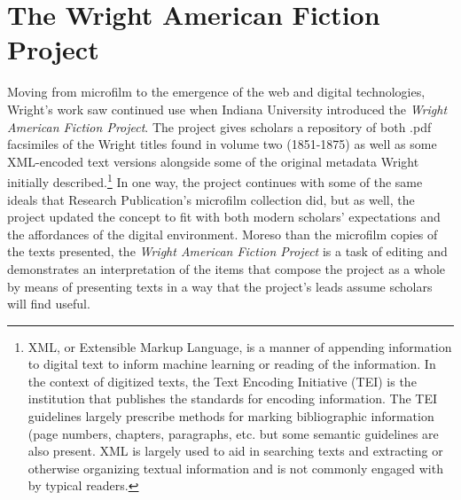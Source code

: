 \section{The Wright American Fiction Project}
Moving from microfilm to the emergence of the web and digital technologies, Wright's work saw continued use when Indiana University introduced the \textit{Wright American Fiction Project}. The project gives scholars a repository of both .pdf facsimiles of the Wright titles found in volume two (1851-1875) as well as some XML-encoded text versions alongside some of the original metadata Wright initially described.\footnote{XML, or Extensible Markup Language, is a manner of appending information to digital text to inform machine learning or reading of the information. In the context of digitized texts, the Text Encoding Initiative (TEI) is the institution that publishes the standards for encoding information. The TEI guidelines largely prescribe methods for marking bibliographic information (page numbers, chapters, paragraphs, etc. but some semantic guidelines are also present. XML is largely used to aid in searching texts and extracting or otherwise organizing textual information and is not commonly engaged with by typical readers.} In one way, the project continues with some of the same ideals that Research Publication's microfilm collection did, but as well, the project updated the concept to fit with both modern scholars' expectations and the affordances of the digital environment. Moreso than the microfilm copies of the texts presented, the \textit{Wright American Fiction Project} is a task of editing and demonstrates an interpretation of the items that compose the project as a whole by means of presenting texts in a way that the project's leads assume scholars will find useful. 

